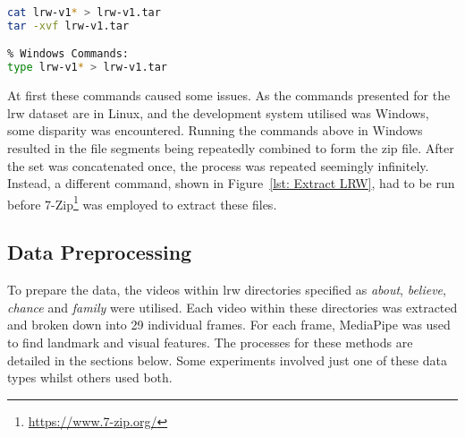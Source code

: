 \begin{lstlisting}[language=Bash, caption={[Commands to combine the sections of the LRW dataset]{Commands to combine the sections of the LRW dataset. Note here that there are two separate sets of commands. The first are the commands presented on the LRW website however, this is seemingly for Linux. The second set is for Windows.}}, label={lst: Extract LRW}]
% Linux Commands:
cat lrw-v1* > lrw-v1.tar
tar -xvf lrw-v1.tar

% Windows Commands:
type lrw-v1* > lrw-v1.tar
\end{lstlisting}
At first these commands caused some issues. As the commands presented for the \acrshort{lrw} dataset are in Linux, and the development system utilised was Windows, some disparity was encountered. Running the commands above in Windows resulted in the file segments being repeatedly combined to form the zip file. After the set was concatenated once, the process was repeated seemingly infinitely.\\
Instead, a different command, shown in Figure~\ref{lst: Extract LRW}, had to be run before 7-Zip\footnote{\url{https://www.7-zip.org/}} was employed to extract these files.
\subsection{Data Preprocessing}
To prepare the data, the videos within \gls{lrw} directories specified as \emph{about}, \emph{believe}, \emph{chance} and \emph{family} were utilised. Each video within these directories was extracted and broken down into 29 individual frames. For each frame, MediaPipe was used to find landmark and visual features. The processes for these methods are detailed in the sections below. Some experiments involved just one of these data types whilst others used both.

